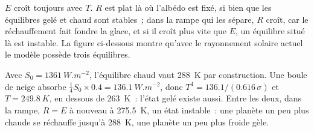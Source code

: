 $E$ croît toujours avec $T$. $R$ est plat là où l'albédo est fixé, si bien que les équilibres gelé et chaud sont stables~;
dans la rampe qui les sépare, $R$ croît, car le réchauffement fait fondre la glace, et si
il croît plus vite que $E$, un équilibre situé là est instable. La figure ci-dessous montre qu'avec le
rayonnement solaire actuel le modèle possède trois équilibres.

\begin{example}\label{ex:b2:precambrian-earth:three}
Avec $S_0 = \qty{1361}{W.m^{-2}}$, l'équilibre chaud vaut \qty{288}{K} par construction. Une
boule de neige absorbe $\tfrac14 S_0\times0.4 = \qty{136.1}{W.m^{-2}}$, donc $T^4 =
136.1/(0.616\,\sigma)$ et $T = \qty{249.8}{K}$, en dessous de \qty{263}{K}~: l'état gelé existe aussi.
Entre les deux, dans la rampe, $R = E$ à nouveau à \qty{275.5}{K}, un état instable~: une
planète un peu plus chaude se réchauffe jusqu'à \qty{288}{K}, une planète un peu plus froide gèle.
\end{example}

